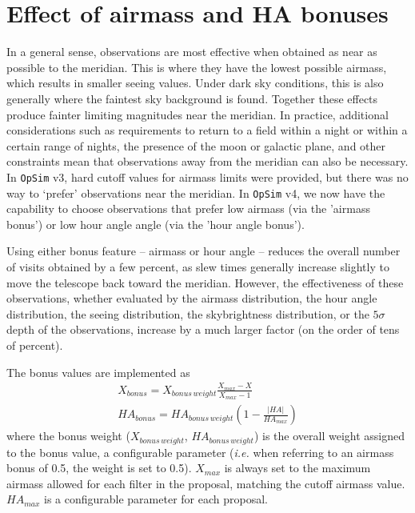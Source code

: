 \documentclass[DM,authoryear,toc]{lsstdoc}
\newcommand{\opsim}{\texttt{OpSim}\xspace}
\begin{document}
\section{Effect of airmass and HA bonuses}

In a general sense, observations are most effective when obtained as near as possible to the meridian. This is where they have the lowest possible airmass, which results in smaller seeing values. Under dark sky conditions, this is also generally where the faintest sky background is found. Together these effects produce fainter limiting magnitudes near the meridian. In practice, additional considerations such as requirements to return to a field within a night or within a certain range of nights, the presence of the moon or galactic plane, and other constraints mean that observations away from the meridian can also be necessary. In \opsim v3, hard cutoff values for airmass limits were provided, but there was no way to `prefer' observations near the meridian. In \opsim v4, we now have the capability to choose observations that prefer low airmass (via the 'airmass bonus') or low hour angle angle (via the 'hour angle bonus').

Using either bonus feature -- airmass or hour angle -- reduces the overall number of visits obtained by a few percent, as slew times generally increase slightly to move the telescope back toward the meridian. However, the effectiveness of these observations, whether evaluated by the airmass distribution, the hour angle distribution, the seeing distribution, the skybrightness distribution, or the $5\sigma$ depth of the observations, increase by a much larger factor (on the order of tens of percent). 

The bonus values are implemented as
\begin{eqnarray}
X_{bonus} = X_{bonus\, weight}  \frac {X_{max} - X}{X_{max} - 1}\\
HA_{bonus} = HA_{bonus\, weight}  \left( 1 - \frac{| HA |}{HA_{max}} \right)
\end{eqnarray}
where the bonus weight ($X_{bonus\, weight}$, $HA_{bonus\, weight}$) is the overall weight assigned to the bonus value, a configurable parameter ({\it i.e.} when referring to an airmass bonus of 0.5, the weight is set to 0.5). $X_{max}$ is always set to the maximum airmass allowed for each filter in the proposal, matching the cutoff airmass value. $HA_{max}$ is a configurable parameter for each proposal.
\end{document}
